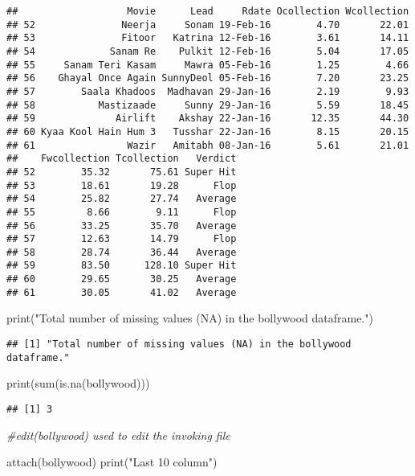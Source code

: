 \documentclass[
]{article}
\newenvironment{Shaded}{\begin{snugshade}}{\end{snugshade}}
\newcommand{\CommentTok}[1]{\textcolor[rgb]{0.56,0.35,0.01}{\textit{#1}}}
\newcommand{\FunctionTok}[1]{\textcolor[rgb]{0.00,0.00,0.00}{#1}}
\newcommand{\NormalTok}[1]{#1}
\newcommand{\StringTok}[1]{\textcolor[rgb]{0.31,0.60,0.02}{#1}}
\begin{document}
\begin{verbatim}
##                   Movie      Lead     Rdate Ocollection Wcollection
## 52               Neerja     Sonam 19-Feb-16        4.70       22.01
## 53               Fitoor   Katrina 12-Feb-16        3.61       14.11
## 54             Sanam Re    Pulkit 12-Feb-16        5.04       17.05
## 55     Sanam Teri Kasam     Mawra 05-Feb-16        1.25        4.66
## 56    Ghayal Once Again SunnyDeol 05-Feb-16        7.20       23.25
## 57        Saala Khadoos  Madhavan 29-Jan-16        2.19        9.93
## 58           Mastizaade     Sunny 29-Jan-16        5.59       18.45
## 59              Airlift    Akshay 22-Jan-16       12.35       44.30
## 60 Kyaa Kool Hain Hum 3   Tusshar 22-Jan-16        8.15       20.15
## 61                Wazir   Amitabh 08-Jan-16        5.61       21.01
##    Fwcollection Tcollection   Verdict
## 52        35.32       75.61 Super Hit
## 53        18.61       19.28      Flop
## 54        25.82       27.74   Average
## 55         8.66        9.11      Flop
## 56        33.25       35.70   Average
## 57        12.63       14.79      Flop
## 58        28.74       36.44   Average
## 59        83.50      128.10 Super Hit
## 60        29.65       30.25   Average
## 61        30.05       41.02   Average
\end{verbatim}

\begin{Shaded}
\begin{Highlighting}[]
\FunctionTok{print}\NormalTok{(}\StringTok{"Total number of missing values (NA) in the bollywood dataframe."}\NormalTok{)}
\end{Highlighting}
\end{Shaded}

\begin{verbatim}
## [1] "Total number of missing values (NA) in the bollywood dataframe."
\end{verbatim}

\begin{Shaded}
\begin{Highlighting}[]
\FunctionTok{print}\NormalTok{(}\FunctionTok{sum}\NormalTok{(}\FunctionTok{is.na}\NormalTok{(bollywood)))}
\end{Highlighting}
\end{Shaded}

\begin{verbatim}
## [1] 3
\end{verbatim}

\begin{Shaded}
\begin{Highlighting}[]
\CommentTok{\#edit(bollywood) used to edit the invoking file}

\FunctionTok{attach}\NormalTok{(bollywood)}
\FunctionTok{print}\NormalTok{(}\StringTok{"Last 10 column"}\NormalTok{)}
\end{Highlighting}
\end{Shaded}
\end{document}

